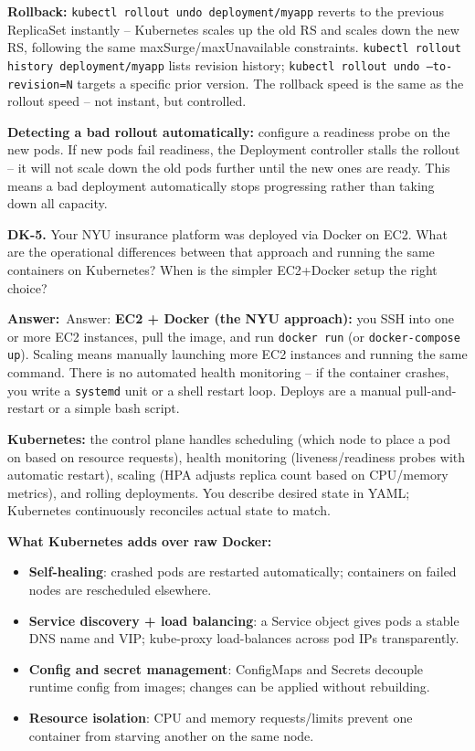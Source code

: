 \documentclass[letterpaper,10pt]{article}
\newlength{\boxwidth}
\newcommand{\answerlabel}{\noindent\textbf{\textcolor{answerblue}{Answer:}}~}
\begin{document}
\textbf{Rollback:} \texttt{kubectl rollout undo deployment/myapp} reverts to the previous ReplicaSet instantly -- Kubernetes scales up the old RS and scales down the new RS, following the same maxSurge/maxUnavailable constraints. \texttt{kubectl rollout history deployment/myapp} lists revision history; \texttt{kubectl rollout undo --to-revision=N} targets a specific prior version. The rollback speed is the same as the rollout speed -- not instant, but controlled.

\textbf{Detecting a bad rollout automatically:} configure a readiness probe on the new pods. If new pods fail readiness, the Deployment controller stalls the rollout -- it will not scale down the old pods further until the new ones are ready. This means a bad deployment automatically stops progressing rather than taking down all capacity.

\vspace{6pt}

\colorbox{qbg}{\begin{minipage}{\boxwidth}
\textbf{DK-5.} Your NYU insurance platform was deployed via Docker on EC2. What are the operational differences between that approach and running the same containers on Kubernetes? When is the simpler EC2+Docker setup the right choice?
\end{minipage}}

\vspace{2pt}
\answerlabel{Answer:} \textbf{EC2 + Docker (the NYU approach):} you SSH into one or more EC2 instances, pull the image, and run \texttt{docker run} (or \texttt{docker-compose up}). Scaling means manually launching more EC2 instances and running the same command. There is no automated health monitoring -- if the container crashes, you write a \texttt{systemd} unit or a shell restart loop. Deploys are a manual pull-and-restart or a simple bash script.

\textbf{Kubernetes:} the control plane handles scheduling (which node to place a pod on based on resource requests), health monitoring (liveness/readiness probes with automatic restart), scaling (HPA adjusts replica count based on CPU/memory metrics), and rolling deployments. You describe desired state in YAML; Kubernetes continuously reconciles actual state to match.

\textbf{What Kubernetes adds over raw Docker:}
\begin{itemize}[itemsep=0pt]
  \item \textbf{Self-healing}: crashed pods are restarted automatically; containers on failed nodes are rescheduled elsewhere.
  \item \textbf{Service discovery + load balancing}: a Service object gives pods a stable DNS name and VIP; kube-proxy load-balances across pod IPs transparently.
  \item \textbf{Config and secret management}: ConfigMaps and Secrets decouple runtime config from images; changes can be applied without rebuilding.
  \item \textbf{Resource isolation}: CPU and memory requests/limits prevent one container from starving another on the same node.
\end{itemize}
\end{document}
